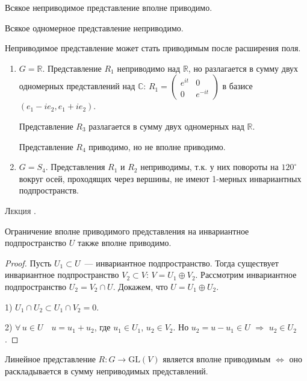 \documentclass[a4paper]{article}
\newcounter{lec}
\renewcommand{\thelec}{\Roman{lec}}
\newcommand*{\lecture}[1]{\refstepcounter{lec}\vspace{20pt}
\begin{center}{\rmfamily\textsc{Лекция \thelec. \\ \textbf{#1}}}\vspace{5pt}
\end{center}}
\begin{document}
Всякое неприводимое представление вполне приводимо.

Всякое одномерное представление неприводимо.

Неприводимое представление может стать приводимым после расширения
поля.

\prim
\begin{enumerate}
  \item $G=\mathbb{R}$. Представление $R_1$ неприводимо над
  $\mathbb{R}$, но разлагается в сумму двух одномерных представлений
  над $\mathbb{C}$: $R_1=\left(\begin{smallmatrix} e^{it} & 0\\ 0 &
  e^{-it}\end{smallmatrix}\right)$ в базисе $(e_1-ie_2, e_1+ie_2)$.

  Представление $R_3$ разлагается в сумму двух одномерных над
  $\mathbb{R}$.

  Представление $R_4$ приводимо, но не вполне приводимо.
  \item $G=S_4$. Представления $R_1$ и $R_2$ неприводимы, т.к. у них
  повороты на $120^\circ$ вокруг осей, проходящих через вершины, не
  имеют 1-мерных инвариантных подпространств.
\end{enumerate}
\lecture{}

\begin{theorem}
Ограничение вполне приводимого представления на инвариантное
подпространство $U$ также вполне приводимо.
\end{theorem}

\begin{proof}
Пусть $U_1\subset U$~--- инвариантное подпространство. Тогда
существует инвариантное подпространство $V_2\subset V$: $V=U_1\oplus
V_2$. Рассмотрим инвариантное подпространство $U_2=V_2\cap U$.
Докажем, что $U=U_1\oplus U_2$.

1) $U_1\cap U_2\subset U_1\cap V_2=0$.

2) $\forall \, u\in U\quad u=u_1+u_2$, где $u_1\in U_1$, $u_2\in
V_2$. Но $u_2=u-u_1\in U$ $\Rightarrow$ $u_2\in U_2$.
\end{proof}

\begin{theorem}
Линейное представление $R\colon G\to \mathrm{GL}(V)$ является вполне
приводимым $\Leftrightarrow$ оно раскладывается в сумму неприводимых
представлений.
\end{theorem}
\end{document}
